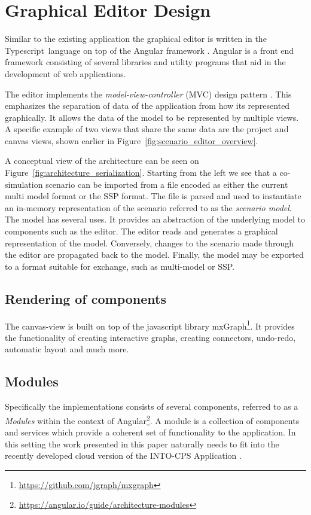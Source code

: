 \section{Graphical Editor Design} \label{sec:architecture}
Similar to the existing application the graphical editor is written in the Typescript\footnotemark\ language on top of the Angular framework \cite{ang&05}. 
Angular is a front end framework consisting of several libraries and utility programs that aid in the development of web applications.

The editor implements the \emph{model-view-controller} (MVC) design pattern \cite{Gamma&95}.
This emphasizes the separation of data of the application from how its represented graphically.
It allows the data of the model to be represented by multiple views.
A specific example of two views that share the same data are the project and canvas views, shown earlier in Figure~\ref{fig:scenario_editor_overview}.



A conceptual view of the architecture can be seen on Figure~\ref{fig:architecture_serialization}.
Starting from the left we see that a co-simulation scenario can be imported from a file encoded as either the current multi model format or the SSP format. 
The file is parsed and used to instantiate an in-memory representation of the scenario referred to as the \emph{scenario model}. 
The model has several uses. It provides an abstraction of the underlying model to components such as the editor.
The editor reads and generates a graphical representation of the model.
Conversely, changes to the scenario made through the editor are propagated back to the model.
Finally, the model may be exported to a format suitable for exchange, such as multi-model or SSP.

\subsection{Rendering of components}
The canvas-view is built on top of the javascript library mxGraph\footnote{\url{https://github.com/jgraph/mxgraph}}.
It provides the functionality of creating interactive graphs, creating connectors, undo-redo, automatic layout and much more.

\subsection{Modules}
Specifically the implementations consists of several components, referred to as a \emph{Modules} within the context of Angular\footnote{\url{https://angular.io/guide/architecture-modules}}.
A module is a collection of components and services which provide a coherent set of functionality to the application. In this setting the work presented in this paper naturally needs to fit into the recently developed cloud version of the INTO-CPS Application \cite{Rasmussen&19}.

